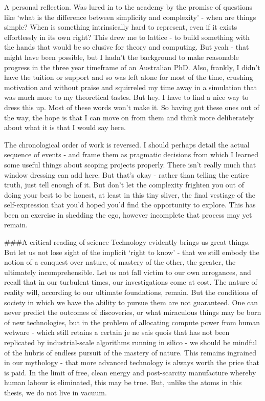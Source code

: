 A personal reflection.
	Was lured in to the academy by the promise of
questions like `what is the difference between simplicity and
complexity' - when are things simple? When is something intrinsically
hard to represent, even if it exists effortlessly in its own right? This
drew me to lattice - to build something with the hands that would be so
elusive for theory and computing.
	But yeah - that might have been
possible, but I hadn't the background to make reasonable progress in the
three year timeframe of an Australian PhD.
	Also, frankly, I didn't have
the tuition or support and so was left alone for most of the time,
crushing motivation and without praise and squirreled my time away in a
simulation that was much more to my theoretical tastes.
	But hey.
	I have
to find a nice way to dress this up.
	Most of these words won't make it.
So having got these ones out of the way, the hope is that I can move on
from them and think more deliberately about what it is that I would say
here.

The chronological order of work is reversed.
	I should perhaps detail the
actual sequence of events - and frame them as pragmatic decisions from
which I learned some useful things about scoping projects properly.
There isn't really much that window dressing can add here.
	But that's
okay - rather than telling the entire truth, just tell enough of it.
	But
don't let the complexity frighten you out of doing your best to be
honest, at least in this tiny sliver, the final vestiage of the
self-expression that you'd hoped you'd find the opportunity to explore.
This has been an exercise in shedding the ego, however incomplete that
process may yet remain.

\#\#\#A critical reading of science Technology evidently brings us great
things.
	But let us not lose sight of the implicit `right to know' - that
we still embody the notion of a conquest over nature, of mastery of the
other, the greater, the ultimately incomprehensible.
	Let us not fall
victim to our own arrogances, and recall that in our turbulent times,
our investigations come at cost.
	The nature of reality will, according
to our ultimate foundations, remain.
	But the conditions of society in
which we have the ability to pursue them are not guaranteed.
	One can
never predict the outcomes of discoveries, or what miraculous things may
be born of new technologies, but in the problem of allocating compute
power from human wetware - which still retains a certain je ne sais
quois that has not been replicated by industrial-scale algorithms
running in silico - we should be mindful of the hubris of endless
pursuit of the mastery of nature.
	This remains ingrained in our
mythology - that more advanced technology is always worth the price that
is paid.
	In the limit of free, clean energy and post-scarcity
manufacture whereby human labour is eliminated, this may be true.
	But,
unlike the atoms in this thesis, we do not live in vacuum.

